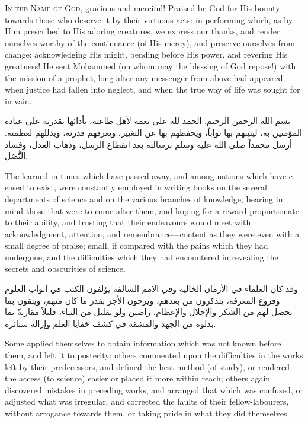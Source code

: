 \documentclass[11pt,a4paper]{book}
\begin{document}
\lettrine[lines=3, lhang=0.33, nindent=0em, findent=3pt, loversize=0.14]{
\textcolor{dropgold}{I}}{n the Name of God,} gracious and merciful! Praised be God for His bounty
towards those who deserve it by their virtuous acts: in performing which, as by
Him prescribed to His adoring creatures, we express our thanks, and render
ourselves worthy of the continuance (of His mercy), and preserve ourselves from
change: acknowledging His might, bending before His power, and revering His
greatness! He sent Mohammed (on whom may the blessing of God repose!) with the
mission of a prophet, long after any messenger from above had appeared, when
justice had fallen into neglect, and when the true way of life was sought for
in vain.

\begin{arabicbox}
\begin{Arabic}
بسم الله الرحمن الرحيم. الحمد لله على نعمه لأهل طاعته، بأدائها
بقدرته على عباده المؤمنين به، ليثيبهم بها ثواباً، ويحفظهم بها
عن التغيير، ويعرفهم قدرته، ويذللهم لعظمته. أرسل محمداً صلى الله
عليه وسلم برسالته بعد انقطاع الرسل، وذهاب العدل، وفساد النُُّصُل.
\end{Arabic}
\end{arabicbox}

The learned in times which have passed away, and among nations which have
c eased to exist, were constantly employed in writing books on the several
departments of science and on the various branches of knowledge, bearing in
mind those that were to come after them, and hoping for a reward proportionate
to their ability, and trusting that their endeavours would meet with
acknowledgment, attention, and remembrance---content as they were even with a
small degree of praise; small, if compared with the pains which they had
undergone, and the difficulties which they had encountered in revealing the
secrets and obscurities of science.

\begin{arabicbox}
\begin{Arabic}
وقد كان العلماء في الأزمان الخالية وفي الأمم السالفة يؤلفون
الكتب في أبواب العلوم وفروع المعرفة، يتذكرون من بعدهم، ويرجون
الأجر بقدر ما كان منهم، ويثقون بما يحصل لهم من الشكر
والإجلال والإعظام، راضين ولو بقليل من الثناء، قليلاً مقارنةً
بما بذلوه من الجهد والمشقة في كشف خفايا العلم وإزالة
ستائره.
\end{Arabic}
\end{arabicbox}

Some applied themselves to obtain information which was not known before them,
and left it to posterity; others commented upon the difficulties in the works
left by their predecessors, and defined the best method (of study), or
rendered the access (to science) easier or placed it more within reach; others
again discovered mistakes in preceding works, and arranged that which was
confused, or adjusted what was irregular, and corrected the faults of their
fellow-labourers, without arrogance towards them, or taking pride in what they
did themselves.
\end{document}
